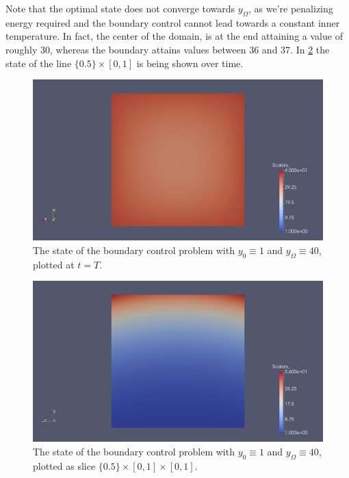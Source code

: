 \documentclass[../thesis.tex]{subfiles}
\begin{document}
Note that the optimal state does not converge towards $y_\Omega$, as we're penalizing energy required and the boundary control cannot lead towards a constant inner temperature. In fact, the center of the domain, is at the end attaining a value of roughly $30$, whereas the boundary attains values between $36$ and $37$.
In \cref{fig:boundary-const-y-cut} the state of the line $\{ 0.5 \} \times [0, 1]$ is being shown over time.
\begin{figure}[htpb]
\centering
\includegraphics[width=\textwidth]{Images/boundary-const-y-endtime.png}
\caption{The state of the boundary control problem with $y_0 \equiv 1$ and $y_\Omega \equiv 40$, plotted at $t = T$.}
\label{fig:boundary-const-y-endtime}
\end{figure}
\begin{figure}[htpb]
\centering
\includegraphics[width=\textwidth]{Images/boundary-const-y-cut.png}
\caption{The state of the boundary control problem with $y_0 \equiv 1$ and $y_\Omega \equiv 40$, plotted as slice $\{ 0.5 \} \times [0, 1] \times [0, 1]$.}
\label{fig:boundary-const-y-cut}
\end{figure}
\FloatBarrier
\end{document}
